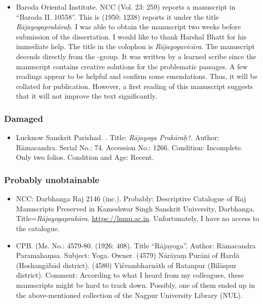 \begin{itemize}
\item Baroda Oriental Institute. NCC (Vol. 23: 259) reports a manuscript in ``Baroda II. 10558''. This is  (1950: 1238) reports it under the title \textit{Rājayogaprakāraḥ}. I was able to obtain the manuscript two weeks before submission of the dissertation. I would like to thank Harshal Bhatt for his immediate help. The title in the colophon is \emph{Rājayogavicāra}. The manuscript decends directly from the \alpha-group. It was written by a learned scribe since the manuscript contains creative solutions for the problematic passages. A few readings appear to be helpful and confirm some emendations. Thus, it will be collated for publication. However, a first reading of this manuscript suggests that it will not improve the text significantly. %
\end{itemize}
  
\subsubsection{Damaged}
\begin{itemize}
\item Lucknow Sanskrit Parishad. . Title: \emph{Rājayoga Prakāraḥ?}. Author: Rāmacandra. Serial No.: 74. Accession No.: 1266. Condition: Incomplete. Only two folios. Condition and Age: Recent. 
\end{itemize}

\subsubsection{Probably unobtainable}
\begin{itemize}  
\item NCC: Darbhanga Raj 2146 (inc.). Probably: Descriptive Catalogue of Raj Manuscripts Preserved in Kameshwar Singh Sanskrit University, Darbhanga. Title=\emph{Rājayogaprakāra}. \url{https://lnmu.ac.in}. Unfortunately, I have no access to the catalogue.
\item CPB. (Ms. No.: 4579-80.  (1926: 408). Title ``Rājayoga''. Author: Rāmacandra Paramahaṃsa. Subject: Yoga. Owner. (4579) Nārāyaṃ Purānī of Hardā (Hoshangābād district). (4580) Viśvambharnāth of Ratanpur (Bilāspur district). Comment: According to what I heard from my colleagues, these manuscripts might be hard to track down. Possibly, one of them ended up in the above-mentioned collection of the Nagpur University Library (NUL). 
\end{itemize}
  

